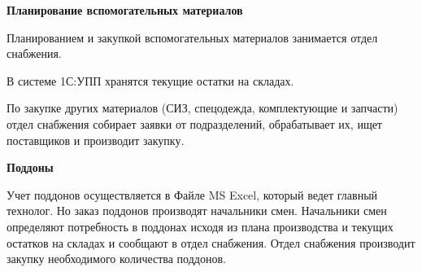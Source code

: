 

\textbf{Планирование вспомогательных материалов}

Планированием и закупкой вспомогательных материалов занимается отдел снабжения.


В системе 1С:УПП хранятся текущие остатки на складах.


По закупке других материалов (СИЗ, спецодежда, комплектующие и запчасти) отдел снабжения собирает заявки от подразделений, обрабатывает их, ищет поставщиков и производит закупку.


\textbf{Поддоны}

Учет поддонов осуществляется в Файле MS Excel, который ведет главный технолог. Но заказ поддонов производят начальники смен. Начальники смен определяют потребность в поддонах исходя из плана производства и текущих остатков на складах и  сообщают в отдел снабжения. Отдел снабжения производит закупку необходимого количества поддонов.  


